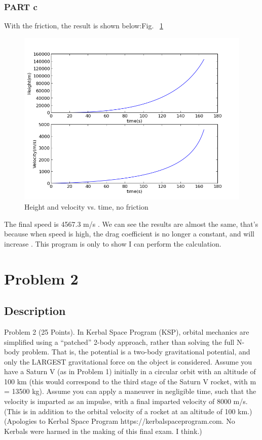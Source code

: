 \documentclass[11pt,letterpaper]{article}
\begin{document}
\subsubsection{PART c}
With the friction, the result is shown below:Fig. ~\ref{figure2}
\begin{figure}
\begin{center}
\includegraphics[width=0.8\linewidth,angle=0]{p1c.png}
\caption{Height and velocity vs. time, no friction}
\label{figure2}
\end{center}
\end{figure}



The final speed is 4567.3 m/s . We can see the results are almost the same, that's because when speed is high, the drag coefficient is no longer a constant, and will increase \cite{drag}. This program is only to show I can perform the calculation.





\section{Problem 2}
\subsection{Description}
Problem 2 (25 Points). In Kerbal Space Program (KSP),
orbital mechanics are simplified using a “patched” 2-body
approach, rather than solving the full N-body problem. That is,
the potential is a two-body gravitational potential, and only the
LARGEST gravitational force on the object is considered.
Assume you have a Saturn V (as in Problem 1) initially in a
circular orbit with an altitude of 100 km (this would correspond
to the third stage of the Saturn V rocket,
with m = 13500 kg). Assume you can apply a
maneuver in negligible time, such that the
velocity is imparted as an impulse, with a final
imparted velocity of 8000 m/s. (This is in
addition to the orbital velocity of a rocket at an
altitude of 100 km.) (Apologies to Kerbal Space
Program https://kerbalspaceprogram.com. No Kerbals
were harmed in the making of this final exam. I think.)
\end{document}
